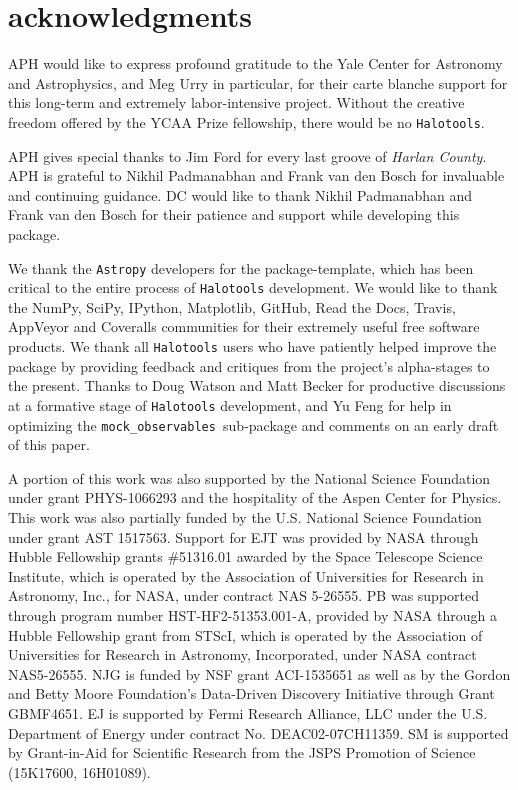 \documentclass[twocolumn, tighten]{aastex6}
\newcommand{\mockobs}{{\tt mock\_observables }}
\begin{document}

\section{acknowledgments}

APH would like to express profound gratitude to the Yale Center for Astronomy and Astrophysics, and Meg Urry in particular, for their carte blanche support for this long-term and extremely labor-intensive project. Without the creative freedom offered by the YCAA Prize fellowship, there would be no {\tt Halotools}.

APH gives special thanks to Jim Ford for every last groove of {\em Harlan County}. APH is grateful to Nikhil Padmanabhan and Frank van den Bosch for invaluable and continuing guidance. DC would like to thank Nikhil Padmanabhan and Frank van den Bosch for their patience and support while developing this package.

We thank the {\tt Astropy} developers for the package-template, which has been critical to the entire process of {\tt Halotools} development.
We would like to thank the NumPy, SciPy, IPython, Matplotlib, GitHub, Read the Docs, Travis, AppVeyor and Coveralls communities for their extremely useful free software products. We thank all {\tt Halotools} users who have patiently helped improve the package by providing feedback and critiques from the project's alpha-stages to the present. Thanks to Doug Watson and Matt Becker for productive discussions at a formative stage of {\tt Halotools} development, and Yu Feng for help in optimizing the \mockobs sub-package and comments on an early draft of this paper.

A portion of this work was also supported by the National Science Foundation under grant PHYS-1066293 and the hospitality of the Aspen Center for Physics. This work was also partially funded by the U.S. National Science Foundation under grant AST 1517563. Support for EJT was provided by NASA through Hubble Fellowship grants \#51316.01 awarded by the Space Telescope Science Institute, which is operated by the Association of Universities for Research in Astronomy, Inc., for NASA, under contract NAS 5-26555.  PB was supported through program number HST-HF2-51353.001-A, provided by NASA through a Hubble Fellowship grant from STScI, which is operated by the Association of Universities for Research in Astronomy, Incorporated, under NASA contract NAS5-26555. NJG is funded by NSF grant ACI-1535651 as well as by the Gordon and Betty Moore Foundation's Data-Driven Discovery Initiative through Grant GBMF4651. EJ is supported by Fermi Research Alliance, LLC under the U.S. Department of Energy under contract No. DEAC02-07CH11359. SM is supported by Grant-in-Aid for Scientific Research from the JSPS Promotion of Science (15K17600, 16H01089).












\end{document}
